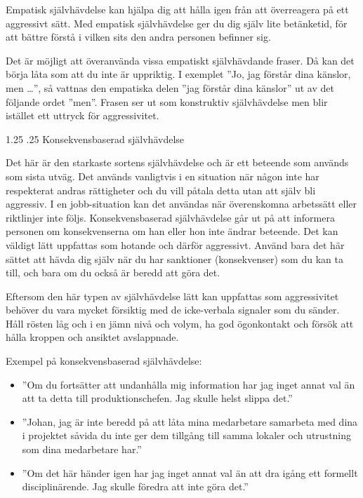 \documentclass[swedish,a4paper]{book}
\makeatletter
\renewcommand\section{\@startsection{section}{1}{\z@}%
                                   {1.25\baselineskip}%
                                   {.25\baselineskip}%
                                   {\fontsize{1.25\baselineskip}{1.25\baselineskip}\selectfont\sffamily\bfseries}} %
\makeatother
\begin{document}
Empatisk självhävdelse kan hjälpa dig att hålla igen från att överreagera på ett aggressivt sätt. Med empatisk självhävdelse ger du dig själv lite betänketid, för att bättre förstå i vilken sits den andra personen befinner sig.

Det är möjligt att överanvända vissa empatiskt självhävdande fraser. Då kan det börja låta som att du inte är uppriktig. I exemplet ''Jo, jag förstår dina känslor, men \ldots{}'', så vattnas den empatiska delen ''jag förstår dina känslor'' ut av det följande ordet ''men''. Frasen ser ut som konstruktiv självhävdelse men blir istället ett uttryck för aggressivitet.

\section{Konsekvensbaserad självhävdelse}

Det här är den starkaste sortens självhävdelse och är ett beteende som används som sista utväg. Det används vanligtvis i en situation när någon inte har respekterat andras rättigheter och du vill påtala detta utan att själv bli aggressiv. I en jobb-situation kan det användas när överenskomna arbetssätt eller riktlinjer inte följs. Konsekvensbaserad självhävdelse går ut på att informera personen om konsekvenserna om han eller hon inte ändrar beteende. Det kan väldigt lätt uppfattas som hotande och därför aggressivt. Använd bara det här sättet att hävda dig själv när du har sanktioner (konsekvenser) som du kan ta till, och bara om du också är beredd att göra det.

Eftersom den här typen av självhävdelse lätt kan uppfattas som aggressivitet behöver du vara mycket försiktig med de icke-verbala signaler som du sänder. Håll rösten låg och i en jämn nivå och volym, ha god ögonkontakt och försök att hålla kroppen och ansiktet avslappnade.

Exempel på konsekvensbaserad självhävdelse:

\begin{itemize}

\item ''Om du fortsätter att undanhålla mig information har jag inget annat val än att ta detta till produktionschefen. Jag skulle helst slippa det.''

\item ''Johan, jag är inte beredd på att låta mina medarbetare samarbeta med dina i projektet såvida du inte ger dem tillgång till samma lokaler och utrustning som dina medarbetare har.''

\item ''Om det här händer igen har jag inget annat val än att dra igång ett formellt disciplinärende. Jag skulle föredra att inte göra det.''

\end{itemize}
\end{document}
